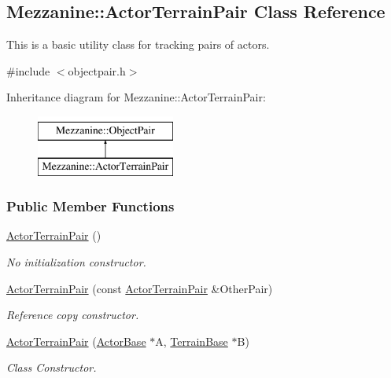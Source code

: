 \hypertarget{classMezzanine_1_1ActorTerrainPair}{
\subsection{Mezzanine::ActorTerrainPair Class Reference}
\label{classMezzanine_1_1ActorTerrainPair}
}


This is a basic utility class for tracking pairs of actors.  




{\ttfamily \#include $<$objectpair.h$>$}

Inheritance diagram for Mezzanine::ActorTerrainPair:\begin{figure}[H]
\begin{center}
\leavevmode
\includegraphics[height=2.000000cm]{classMezzanine_1_1ActorTerrainPair}
\end{center}
\end{figure}
\subsubsection*{Public Member Functions}
\begin{DoxyCompactItemize}
\item 
\hypertarget{classMezzanine_1_1ActorTerrainPair_ac29e4e48fe90868c2116f8922ed55883}{
\hyperlink{classMezzanine_1_1ActorTerrainPair_ac29e4e48fe90868c2116f8922ed55883}{ActorTerrainPair} ()}
\label{classMezzanine_1_1ActorTerrainPair_ac29e4e48fe90868c2116f8922ed55883}

\begin{DoxyCompactList}\small\item\em No initialization constructor. \item\end{DoxyCompactList}\item 
\hyperlink{classMezzanine_1_1ActorTerrainPair_a357d70101ba07b28394d5ce38f9b106a}{ActorTerrainPair} (const \hyperlink{classMezzanine_1_1ActorTerrainPair}{ActorTerrainPair} \&OtherPair)
\begin{DoxyCompactList}\small\item\em Reference copy constructor. \item\end{DoxyCompactList}\item 
\hyperlink{classMezzanine_1_1ActorTerrainPair_a7200e72f9b183cda93d8cb298f65974f}{ActorTerrainPair} (\hyperlink{classMezzanine_1_1ActorBase}{ActorBase} $\ast$A, \hyperlink{classMezzanine_1_1TerrainBase}{TerrainBase} $\ast$B)
\begin{DoxyCompactList}\small\item\em Class Constructor. \item\end{DoxyCompactList}\end{DoxyCompactItemize}
